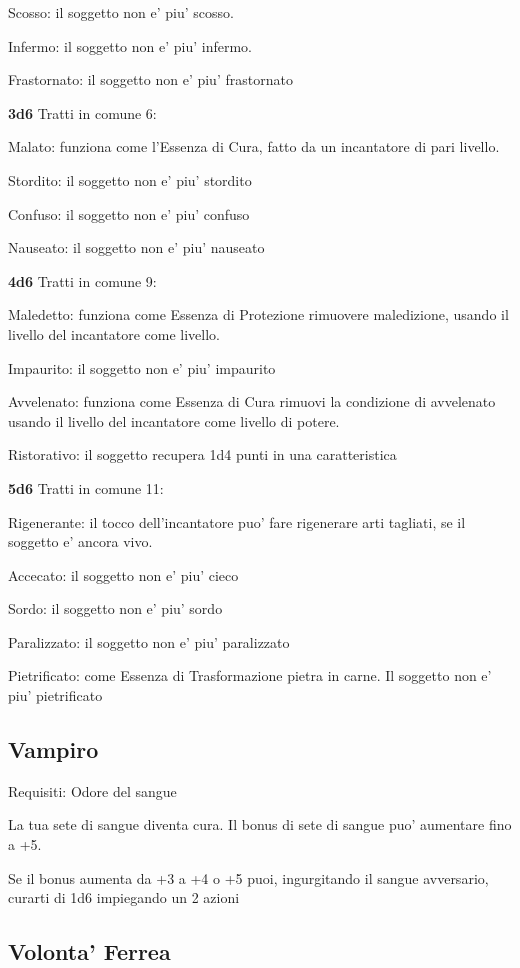 \documentclass[a4paper,11pt,twoside,openany]{book}
\begin{document}
Scosso: il soggetto non e' piu' scosso.

Infermo: il soggetto non e' piu' infermo.

Frastornato: il soggetto non e' piu' frastornato

\textbf{3d6} Tratti in comune 6:

Malato: funziona come l'Essenza di Cura, fatto da un incantatore di pari livello.

Stordito: il soggetto non e' piu' stordito

Confuso: il soggetto non e' piu' confuso

Nauseato: il soggetto non e' piu' nauseato

\textbf{4d6} Tratti in comune 9:

Maledetto: funziona come Essenza di Protezione rimuovere maledizione, usando il livello del incantatore come livello.

Impaurito: il soggetto non e' piu' impaurito

Avvelenato: funziona come Essenza di Cura rimuovi la condizione di avvelenato usando il livello del incantatore come livello di potere.

Ristorativo: il soggetto recupera 1d4 punti in una caratteristica

\textbf{5d6} Tratti in comune 11:

Rigenerante: il tocco dell'incantatore puo' fare rigenerare arti tagliati, se il soggetto e' ancora vivo.

Accecato: il soggetto non e' piu' cieco

Sordo: il soggetto non e' piu' sordo

Paralizzato: il soggetto non e' piu' paralizzato

Pietrificato: come Essenza di Trasformazione pietra in carne. Il soggetto non e' piu' pietrificato

\subsection{Vampiro}

Requisiti: Odore del sangue

La tua sete di sangue diventa cura. Il bonus di sete di sangue puo' aumentare fino a +5.

Se il bonus aumenta da +3 a +4 o +5 puoi, ingurgitando il sangue avversario, curarti di 1d6 impiegando un 2 azioni

\subsection{Volonta' Ferrea}
\end{document}
